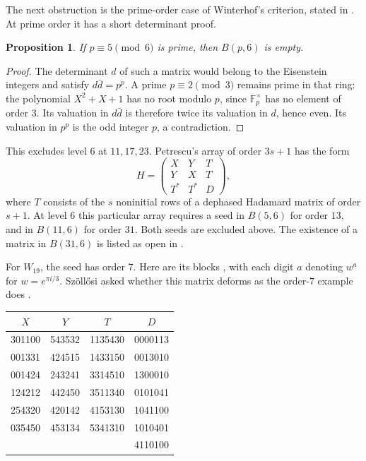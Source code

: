 \documentclass[11pt,a4paper]{article}
\newtheorem{proposition}[theorem]{Proposition}
\numberwithin{equation}{section}
\begin{document}
The next obstruction is the prime-order case of Winterhof's criterion, stated in \cite[Theorem~3.2.12]{szthesis}. At prime order it has a short determinant proof.

\begin{proposition}\label{prime:sixnonexist}
If $p\equiv5\pmod6$ is prime, then $B(p,6)$ is empty.
\end{proposition}
\begin{proof}
The determinant $d$ of such a matrix would belong to the Eisenstein integers and satisfy $d\bar d=p^p$. A prime $p\equiv2\pmod3$ remains prime in that ring: the polynomial $X^2+X+1$ has no root modulo $p$, since $\mathbb F_p^\times$ has no element of order $3$. Its valuation in $d\bar d$ is therefore twice its valuation in $d$, hence even. Its valuation in $p^p$ is the odd integer $p$, a contradiction.
\end{proof}

This excludes level $6$ at $11,17,23$. Petrescu's array of order $3s+1$ has the form
$$H=\begin{pmatrix}X&Y&T\\Y&X&T\\T^*&T^*&D\end{pmatrix},$$
where $T$ consists of the $s$ noninitial rows of a dephased Hadamard matrix of order $s+1$. At level $6$ this particular array requires a seed in $B(5,6)$ for order $13$, and in $B(11,6)$ for order $31$. Both seeds are excluded above. The existence of a matrix in $B(31,6)$ is listed as open in \cite{cms}.

For $W_{19}$, the seed has order $7$. Here are its blocks \cite{sz19}, with each digit $a$ denoting $w^a$ for $w=e^{\pi i/3}$. Sz\"oll\H{o}si asked whether this matrix deforms as the order-$7$ example does \cite{szthesis}.
\begin{center}
\begin{tabular}{cccc}
\toprule $X$ & $Y$ & $T$ & $D$\\ \midrule
301100&543532&1135430&0000113\\
001331&424515&1433150&0013010\\
001424&243241&3314510&1300010\\
124212&442450&3511340&0101041\\
254320&420142&4153130&1041100\\
035450&453134&5341310&1010401\\
&&&4110100\\ \bottomrule
\end{tabular}
\end{center}
\end{document}
